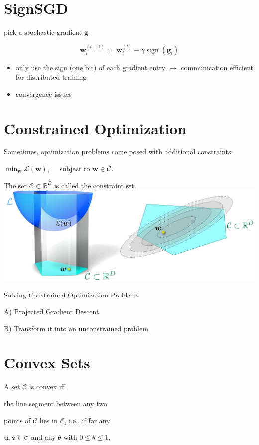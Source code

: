 \documentclass[10pt]{article}
\begin{document}
\section*{SignSGD}
pick a stochastic gradient $\mathbf{g}$

$$
\mathbf{w}_{i}^{(t+1)}:=\mathbf{w}_{i}^{(t)}-\gamma \operatorname{sign}\left(\mathbf{g}_{i}\right)
$$

\begin{itemize}
  \item only use the sign (one bit) of each gradient entry $\rightarrow$ communication efficient for distributed training
  \item convergence issues
\end{itemize}

\section*{Constrained Optimization}
Sometimes, optimization problems come posed with additional constraints:

$\min _{\mathbf{w}} \mathcal{L}(\mathbf{w}), \quad$ subject to $\mathbf{w} \in \mathcal{C}$.

The set $\mathcal{C} \subset \mathbb{R}^{D}$ is called the constraint set.
\includegraphics[max width=\textwidth, center]{2023_12_30_4ff132a3450066e65b4fg-15}

Solving Constrained Optimization Problems

A) Projected Gradient Descent

B) Transform it into an unconstrained problem

\section*{Convex Sets}
A set $\mathcal{C}$ is convex iff

the line segment between any two

points of $\mathcal{C}$ lies in $\mathcal{C}$, i.e., if for any

$\mathbf{u}, \mathbf{v} \in \mathcal{C}$ and any $\theta$ with $0 \leq \theta \leq 1$,
\end{document}
